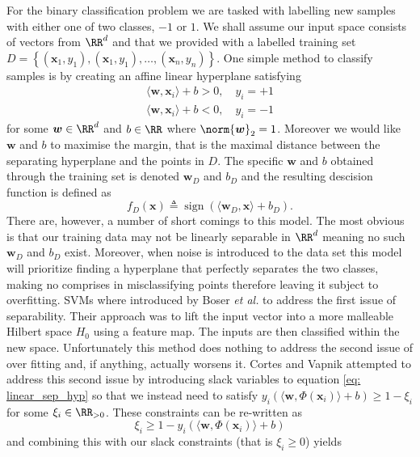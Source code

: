 For the binary classification problem we are tasked with labelling new samples with either one of two classes, $-1$ or $1$. We shall assume our input space consists of vectors from $\RR^d$ and that we provided with a labelled training set $D = \left\{ \left( \bm{x}_1 , y_1 \right), \left( \bm{x}_1 , y_1 \right), \ldots , \left( \bm{x}_n , y_n \right) \right\}$. One simple method to classify samples is by creating an affine linear hyperplane satisfying
\begin{align} \label{eq: linear_sep_hyp}
    \langle \bm{w}, \bm{x}_i \rangle + b > 0, \quad y_i = +1 \nonumber \\
    \langle \bm{w}, \bm{x}_i \rangle + b < 0, \quad y_i = -1
\end{align}
for some $\bm{w} \in \RR^d$ and $b \in \RR$ where $\norm{\bm{w}}_2 = 1$. Moreover we would like $\bm{w}$ and $b$ to maximise the margin, that is the maximal distance between the separating hyperplane and the points in $D$. The specific $\bm{w}$ and $b$ obtained through the training set is denoted $\bm{w}_D$ and $b_D$ and the resulting descision function is defined as
\[
    f_D \left( \bm{x} \right) \triangleq \operatorname{sign} \left( \langle \bm{w}_D , \bm{x} \rangle + b_D \right).
\]
There are, however, a number of short comings to this model. The most obvious is that our training data may not be linearly separable in $\RR^d$ meaning no such $\bm{w}_D$ and $b_D$ exist. Moreover, when noise is introduced to the data set this model will prioritize finding a hyperplane that perfectly separates the two classes, making no comprises in misclassifying points therefore leaving it subject to overfitting. SVMs where introduced by Boser {\it et al.} \cite{BoserBernhard1992Ataf} to address the first issue of separability. Their approach was to lift the input vector into a more malleable Hilbert space $H_0$ using a feature map. The inputs are then classified within the new space. Unfortunately this method does nothing to address the second issue of over fitting and, if anything, actually worsens it. Cortes and Vapnik \cite{CortesCorinna1995SN} attempted to address this second issue by introducing slack variables to equation \ref{eq: linear_sep_hyp} so that we instead need to satisfy $y_i \left( \langle \bm{w} , \Phi \left( \bm{x}_i \right) \rangle + b \right) \geq 1 - \xi_i$ for some $\xi_i \in \RR_{>0}$. These constraints can be re-written as
\[
    \xi_i \geq 1 - y_i \left( \langle \bm{w} , \Phi \left( \bm{x}_i \right) \rangle + b \right)
\]
and combining this with our slack constraints (that is $\xi_i \geq 0$) yields
